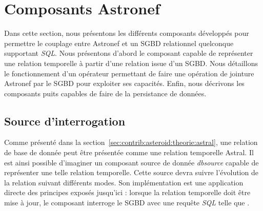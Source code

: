 \section{Composants Astronef}\label{sec:contrib:asteroid:composants}
Dans cette section, nous présentons les différents composants développés pour permettre le couplage entre Astronef et un SGBD relationnel quelconque supportant \textit{SQL}. Nous présentons d'abord le composant capable de représenter une relation temporelle à partir d'une relation issue d'un SGBD. Nous détaillons le fonctionnement d'un opérateur permettant de faire une opération de jointure Astronef par le SGBD pour exploiter ses capacités. Enfin, nous décrivons les composants puits capables de faire de la persistance de données.

\subsection{Source d'interrogation}
Comme présenté dans la section~\ref{sec:contrib:asteroid:theorie:astral}, une relation de base de donnée peut être présentée comme une relation temporelle Astral. Il est ainsi possible d'imaginer un composant source de donnée \textit{dbsource} capable de représenter une telle relation temporelle. Cette source devra suivre l'évolution de la relation suivant différents modes. Son implémentation est une application directe des principes exposés jusqu'ici : lorsque la relation temporelle doit être mise à jour, le composant interroge le SGBD avec une requête \textit{SQL} telle que .

